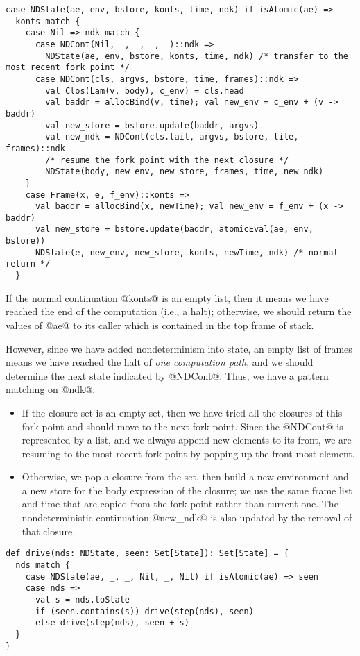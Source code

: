 \documentclass[acmsmall]{acmart}\settopmatter{}
\begin{document}
\begin{lstlisting}
case NDState(ae, env, bstore, konts, time, ndk) if isAtomic(ae) =>
  konts match {
    case Nil => ndk match {
      case NDCont(Nil, _, _, _, _)::ndk =>
        NDState(ae, env, bstore, konts, time, ndk) /* transfer to the most recent fork point */
      case NDCont(cls, argvs, bstore, time, frames)::ndk =>
        val Clos(Lam(v, body), c_env) = cls.head
        val baddr = allocBind(v, time); val new_env = c_env + (v -> baddr)
        val new_store = bstore.update(baddr, argvs)
        val new_ndk = NDCont(cls.tail, argvs, bstore, tile, frames)::ndk
        /* resume the fork point with the next closure */
        NDState(body, new_env, new_store, frames, time, new_ndk)
    }
    case Frame(x, e, f_env)::konts =>
      val baddr = allocBind(x, newTime); val new_env = f_env + (x -> baddr)
      val new_store = bstore.update(baddr, atomicEval(ae, env, bstore))
      NDState(e, new_env, new_store, konts, newTime, ndk) /* normal return */
  }
\end{lstlisting}

If the normal continuation @konts@ is an empty list, then it means we have reached
the end of the computation (i.e., a halt); otherwise, we should return the values of 
@ae@ to its caller which is contained in the top frame of stack.

However, since we have added nondeterminism into state, an empty list of frames means
we have reached the halt of \textit{one computation path}, and we should
determine the next state indicated by @NDCont@.
Thus, we have a pattern matching on @ndk@:
\begin{itemize}
  \item If the closure set is an empty set,
then we have tried all the closures of this fork point and should move to the
next fork point. Since the @NDCont@ is represented by a list, and we always
append new elements to its front, we are resuming to the most recent fork point by
popping up the front-most element.
  \item Otherwise, we pop a closure from the set, then build a new
environment and a new store for the body expression of the closure;
we use the same frame list and time that are copied from the fork point rather
than current one.
The nondeterministic continuation @new_ndk@ is also updated by the removal of that closure.
\end{itemize}

\begin{lstlisting}
def drive(nds: NDState, seen: Set[State]): Set[State] = {
  nds match {
    case NDState(ae, _, _, Nil, _, Nil) if isAtomic(ae) => seen
    case nds =>
      val s = nds.toState
      if (seen.contains(s)) drive(step(nds), seen)
      else drive(step(nds), seen + s)
  }
}
\end{lstlisting}
\end{document}
